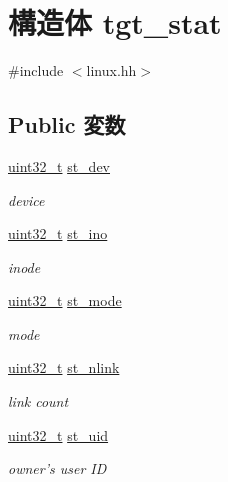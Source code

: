 \hypertarget{structLinux_1_1tgt__stat}{
\section{構造体 tgt\_\-stat}
\label{structLinux_1_1tgt__stat}
}


{\ttfamily \#include $<$linux.hh$>$}\subsection*{Public 変数}
\begin{DoxyCompactItemize}
\item 
\hyperlink{Type_8hh_a435d1572bf3f880d55459d9805097f62}{uint32\_\-t} \hyperlink{structLinux_1_1tgt__stat_a96c0e3ea3acf24a90e33ed627147bf84}{st\_\-dev}
\begin{DoxyCompactList}\small\item\em device \item\end{DoxyCompactList}\item 
\hyperlink{Type_8hh_a435d1572bf3f880d55459d9805097f62}{uint32\_\-t} \hyperlink{structLinux_1_1tgt__stat_a30ef9dc767fe6e3dca64f8fbf71af690}{st\_\-ino}
\begin{DoxyCompactList}\small\item\em inode \item\end{DoxyCompactList}\item 
\hyperlink{Type_8hh_a435d1572bf3f880d55459d9805097f62}{uint32\_\-t} \hyperlink{structLinux_1_1tgt__stat_a75f55d064ed3b380b0315de36e178885}{st\_\-mode}
\begin{DoxyCompactList}\small\item\em mode \item\end{DoxyCompactList}\item 
\hyperlink{Type_8hh_a435d1572bf3f880d55459d9805097f62}{uint32\_\-t} \hyperlink{structLinux_1_1tgt__stat_ab77c257c135fa586e930ef0bf0977c08}{st\_\-nlink}
\begin{DoxyCompactList}\small\item\em link count \item\end{DoxyCompactList}\item 
\hyperlink{Type_8hh_a435d1572bf3f880d55459d9805097f62}{uint32\_\-t} \hyperlink{structLinux_1_1tgt__stat_ad5477a292a4edf27aa5766e01e0f5d1f}{st\_\-uid}
\begin{DoxyCompactList}\small\item\em owner's user ID \item\end{DoxyCompactList}\item 

\end{DoxyCompactItemize}
